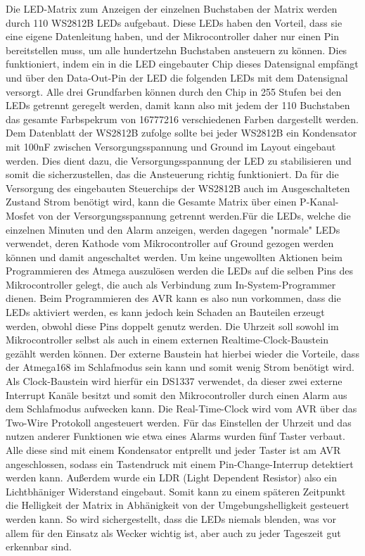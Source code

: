 \documentclass[12pt,journal,compsoc]{IEEEtran}
\begin{document}
Die LED-Matrix zum Anzeigen der einzelnen Buchstaben der Matrix werden durch 110 WS2812B LEDs aufgebaut. Diese LEDs haben den Vorteil, dass sie eine eigene Datenleitung haben, und der Mikrocontroller daher nur einen Pin bereitstellen muss, um alle hundertzehn Buchstaben ansteuern zu können. Dies funktioniert, indem ein in die LED eingebauter Chip dieses Datensignal empfängt und über den Data-Out-Pin der LED die folgenden LEDs mit dem Datensignal versorgt. Alle drei Grundfarben können durch den Chip in 255 Stufen bei den LEDs getrennt geregelt werden, damit kann also mit jedem der 110 Buchstaben das gesamte Farbspekrum von 16777216 verschiedenen Farben dargestellt werden. Dem Datenblatt der WS2812B zufolge sollte bei jeder WS2812B ein Kondensator mit 100nF zwischen Versorgungsspannung und Ground im Layout eingebaut werden. Dies dient dazu, die Versorgungsspannung der  LED zu stabilisieren und somit die sicherzustellen, das die Ansteuerung richtig funktioniert. Da für die Versorgung des eingebauten Steuerchips der WS2812B auch im Ausgeschalteten Zustand Strom benötigt wird, kann die Gesamte Matrix über einen P-Kanal-Mosfet von der Versorgungsspannung getrennt werden.Für die LEDs, welche die einzelnen Minuten und den Alarm anzeigen, werden dagegen "normale" LEDs verwendet, deren Kathode vom Mikrocontroller auf Ground gezogen werden können und damit angeschaltet werden. Um keine ungewollten Aktionen beim Programmieren des Atmega auszulösen werden die LEDs auf die selben Pins des Mikrocontroller gelegt, die auch als Verbindung zum In-System-Programmer dienen. Beim Programmieren des AVR kann es also nun vorkommen, dass  die LEDs aktiviert werden, es kann jedoch kein Schaden an Bauteilen erzeugt werden, obwohl diese Pins doppelt genutz werden.
Die Uhrzeit soll sowohl im Mikrocontroller selbst als auch in einem externen Realtime-Clock-Baustein gezählt werden können. Der externe Baustein hat hierbei wieder die Vorteile, dass der Atmega168 im Schlafmodus sein kann und somit wenig Strom benötigt wird. Als Clock-Baustein wird hierfür ein DS1337 verwendet, da dieser zwei externe Interrupt Kanäle besitzt und somit den Mikrocontroller durch einen Alarm aus dem Schlafmodus aufwecken kann. Die Real-Time-Clock wird vom AVR über das Two-Wire Protokoll angesteuert werden.
Für das Einstellen der Uhrzeit und das nutzen anderer Funktionen wie etwa eines Alarms wurden fünf Taster verbaut. Alle diese sind mit einem Kondensator entprellt und jeder Taster ist am AVR angeschlossen, sodass ein Tastendruck mit einem Pin-Change-Interrup detektiert werden kann. 
Außerdem wurde ein LDR (Light Dependent Resistor) also ein Lichtbhäniger Widerstand eingebaut. Somit kann zu einem späteren Zeitpunkt die Helligkeit der Matrix in Abhänigkeit von der Umgebungshelligkeit gesteuert werden kann. So wird sichergestellt, dass die LEDs niemals blenden, was vor allem für den Einsatz als Wecker wichtig ist, aber auch zu jeder Tageszeit gut erkennbar sind.
\end{document}
